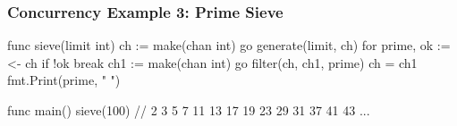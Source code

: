 \documentclass[handout,compress,t,11pt]{beamer}
\begin{document}
\begin{frame}[fragile]
\frametitle{Concurrency Example 3: Prime Sieve}
\begin{golang}
func sieve(limit int) {
    ch := make(chan int)
    go generate(limit, ch)
    for {
        prime, ok := <- ch
        if !ok {
            break
        }
        ch1 := make(chan int)
        go filter(ch, ch1, prime)
        ch = ch1
        fmt.Print(prime, " ")
    }
}

func main() {
    sieve(100) // 2 3 5 7 11 13 17 19 23 29 31 37 41 43 ... 
}
\end{golang}
\end{frame}

%
%


%
%
%
%
%
%
\end{document}
